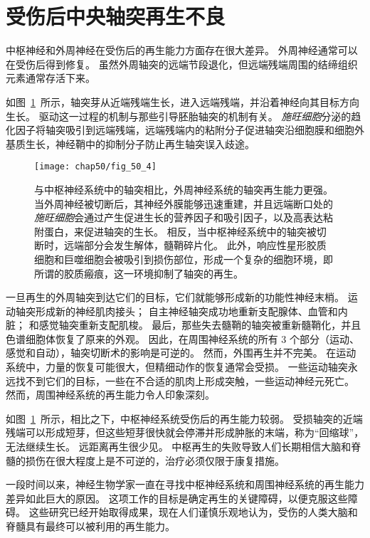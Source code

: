 \section{受伤后中央轴突再生不良}

中枢神经和外周神经在受伤后的再生能力方面存在很大差异。
外周神经通常可以在受伤后得到修复。
虽然外周轴突的远端节段退化，但远端残端周围的结缔组织元素通常存活下来。


如图~\ref{fig:50_4}~所示，轴突芽从近端残端生长，进入远端残端，并沿着神经向其目标方向生长。
驱动这一过程的机制与那些引导胚胎轴突的机制有关。 
\textit{施旺细胞}分泌的趋化因子将轴突吸引到远端残端，远端残端内的粘附分子促进轴突沿细胞膜和细胞外基质生长，神经鞘中的抑制分子防止再生轴突误入歧途。


\begin{figure}[htbp]
	\centering
	\texttt{[image: chap50/fig\_50\_4]}
	\caption{与中枢神经系统中的轴突相比，外周神经系统的轴突再生能力更强。
		当外周神经被切断后，其神经外膜能够迅速重建，并且远端断口处的\textit{施旺细胞}会通过产生促进生长的营养因子和吸引因子，以及高表达粘附蛋白，来促进轴突的生长。
		相反，当中枢神经系统中的轴突被切断时，远端部分会发生解体，髓鞘碎片化。
		此外，响应性星形胶质细胞和巨噬细胞会被吸引到损伤部位，形成一个复杂的细胞环境，即所谓的胶质瘢痕，这一环境抑制了轴突的再生。 }
	\label{fig:50_4}
\end{figure}


一旦再生的外周轴突到达它们的目标，它们就能够形成新的功能性神经末梢。
运动轴突形成新的神经肌肉接头；
自主神经轴突成功地重新支配腺体、血管和内脏；
和感觉轴突重新支配肌梭。
最后，那些失去髓鞘的轴突被重新髓鞘化，并且色谱细胞体恢复了原来的外观。
因此，在周围神经系统的所有 3 个部分（运动、感觉和自动），轴突切断术的影响是可逆的。
然而，外围再生并不完美。
在运动系统中，力量的恢复可能很大，但精细动作的恢复通常会受损。
一些运动轴突永远找不到它们的目标，一些在不合适的肌肉上形成突触，一些运动神经元死亡。
然而，周围神经系统的再生能力令人印象深刻。


如图~\ref{fig:50_4}~所示，相比之下，中枢神经系统受伤后的再生能力较弱。
受损轴突的近端残端可以形成短芽，但这些短芽很快就会停滞并形成肿胀的末端，称为“回缩球”，无法继续生长。
远距离再生很少见。
中枢再生的失败导致人们长期相信大脑和脊髓的损伤在很大程度上是不可逆的，治疗必须仅限于康复措施。


一段时间以来，神经生物学家一直在寻找中枢神经系统和周围神经系统的再生能力差异如此巨大的原因。
这项工作的目标是确定再生的关键障碍，以便克服这些障碍。
这些研究已经开始取得成果，现在人们谨慎乐观地认为，受伤的人类大脑和脊髓具有最终可以被利用的再生能力。


